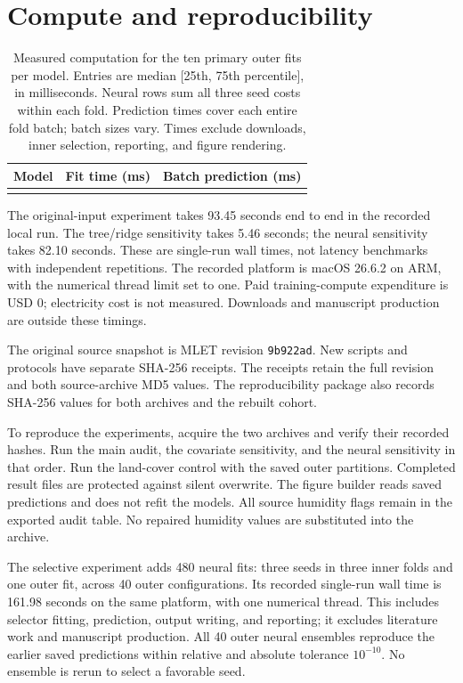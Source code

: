 \documentclass[10pt,letterpaper]{article}
\makeatletter
\let\tableinput\@@input
\makeatother
\begin{document}
\section{Compute and reproducibility}
\begin{table}[t]
\captionsetup{width=.96\textwidth}
\centering\small
\caption{Measured computation for the ten primary outer fits per model.
Entries are median [25th, 75th percentile], in milliseconds.
Neural rows sum all three seed costs within each fold.
Prediction times cover each entire fold batch; batch sizes vary.
Times exclude downloads, inner selection, reporting, and figure rendering.}
\begin{tabular}{lrr}\toprule
Model & Fit time (ms) & Batch prediction (ms)\\\midrule
\tableinput{table_cost.tex}
\bottomrule\end{tabular}
\end{table}
The original-input experiment takes 93.45 seconds end to end in the recorded local run.
The tree/ridge sensitivity takes 5.46 seconds; the neural sensitivity takes 82.10 seconds.
These are single-run wall times, not latency benchmarks with independent repetitions.
The recorded platform is macOS 26.6.2 on ARM, with the numerical thread limit set to one.
Paid training-compute expenditure is USD 0; electricity cost is not measured.
Downloads and manuscript production are outside these timings.

The original source snapshot is MLET revision \texttt{9b922ad}.
New scripts and protocols have separate SHA-256 receipts.
The receipts retain the full revision and both source-archive MD5 values.
The reproducibility package also records SHA-256 values for both archives and the rebuilt cohort.

To reproduce the experiments, acquire the two archives and verify their recorded hashes.
Run the main audit, the covariate sensitivity, and the neural sensitivity in that order.
Run the land-cover control with the saved outer partitions.
Completed result files are protected against silent overwrite.
The figure builder reads saved predictions and does not refit the models.
All source humidity flags remain in the exported audit table.
No repaired humidity values are substituted into the archive.

The selective experiment adds 480 neural fits: three seeds in three inner folds and one outer fit, across 40 outer configurations.
Its recorded single-run wall time is 161.98 seconds on the same platform, with one numerical thread.
This includes selector fitting, prediction, output writing, and reporting; it excludes literature work and manuscript production.
All 40 outer neural ensembles reproduce the earlier saved predictions within relative and absolute tolerance $10^{-10}$.
No ensemble is rerun to select a favorable seed.
\clearpage\onecolumn
\end{document}
